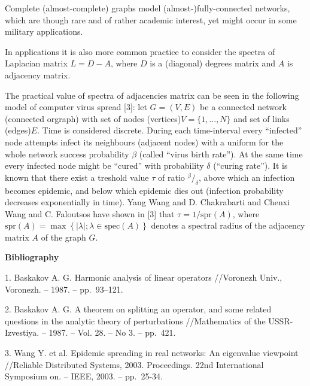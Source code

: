 \documentclass[11pt]{article}
\begin{document}
Complete (almost-complete) graphs model (almost-)fully-connected networks,
which are though rare and of rather academic interest,
yet might occur in some military applications.

In applications it is also more common practice to consider
the spectra of Laplacian matrix \( L = D - A \),
where \( D \) is a (diagonal) degrees matrix
and \( A \) is adjacency matrix.

The practical value of spectra of adjacencies matrix
can be seen in the following model of computer virus spread [3]:
let \( G = (V, E) \) be a connected network (connected orgraph)
with set of nodes (vertices)\( V = \{1, \ldots, N\} \)
and set of links (edges)\( E \).
Time is considered discrete.
During each time-interval every ``infected'' node
attempts infect its neighbours (adjacent nodes)
with a uniform for the whole network success probability \( \beta \) (called ``virus birth rate'').
At the same time every infected node might be ``cured'' with probability \( \delta \) (``curing rate'').
It is known that there exist a treshold value \( \tau \) of ratio \( {^\beta}/_{\delta} \),
above which an infection becomes epidemic,
and below which epidemic dies out (infection probability decreases exponentially in time).
Yang Wang and D. Chakrabarti and Chenxi Wang and C. Faloutsos have shown in [3]
that \( \tau = 1/\mathrm{spr}\left({A}\right) \),
where \( \mathrm{spr}\left({A}\right) = \max\left\{\lvert \lambda\rvert; \lambda\in\mathrm{spec}\left(A\right) \right\} \)
denotes a spectral radius of the adjacency matrix \( A \) of the graph \( G \).

\centerline{\textbf{Bibliography}}

1. Baskakov A. G. Harmonic analysis of linear operators //Voronezh Univ., Voronezh. – 1987. -- pp.~93--121.

2. Baskakov A. G. A theorem on splitting an operator, and some related questions in the analytic theory of perturbations
   //Mathematics of the USSR-Izvestiya. – 1987. – Vol. 28. – No 3. – pp.~421.

3. Wang Y. et al. Epidemic spreading in real networks: An eigenvalue viewpoint
   //Reliable Distributed Systems, 2003. Proceedings. 22nd International Symposium on. – IEEE, 2003. – pp.~25-34.
\end{document}
